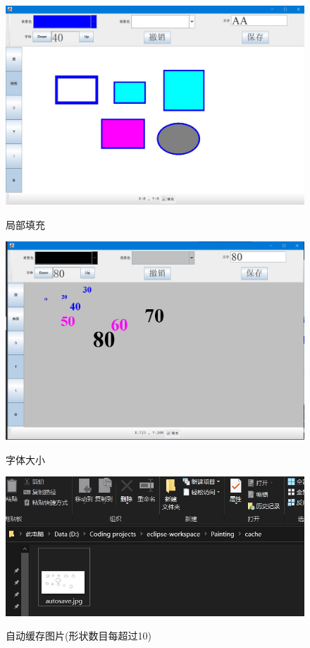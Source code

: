 \documentclass{ctexart}
\begin{document}
\begin{figure}[htbp]
    \centering
    \caption{局部填充}
    \includegraphics[scale = 0.4]{4.jpg}
    \label{fig:4}
\end{figure}
\begin{figure}[htbp]
    \centering
    \caption{字体大小}
    \includegraphics[scale = 0.4]{5.jpg}
    \label{fig:5}
\end{figure}
\begin{figure}[htbp]
    \centering
    \caption{自动缓存图片(形状数目每超过10)}
    \includegraphics[scale = 0.7]{6.jpg}
    \label{fig:6}
\end{figure}
\end{document}
